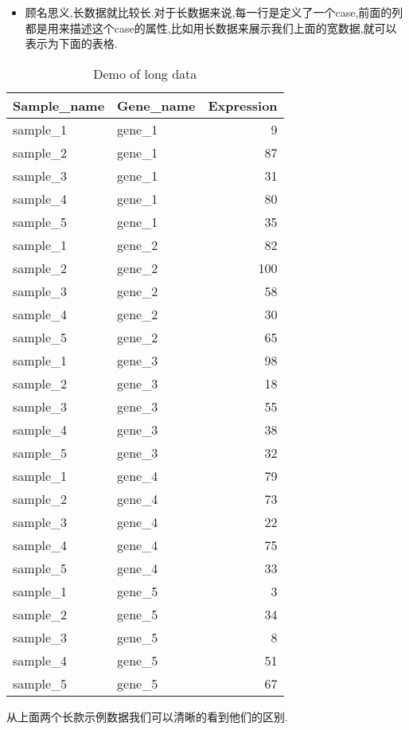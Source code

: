 \documentclass[]{book}
\providecommand{\tightlist}{%
  \setlength{\itemsep}{0pt}\setlength{\parskip}{0pt}}
\begin{document}
\begin{itemize}
\tightlist
\item
  顾名思义,长数据就比较长.对于长数据来说,每一行是定义了一个case,前面的列都是用来描述这个case的属性,比如用长数据来展示我们上面的宽数据,就可以表示为下面的表格.
\end{itemize}

\begin{table}

\caption{\label{tab:unnamed-chunk-2}Demo of long data}
\centering
\begin{tabular}[t]{llr}
\toprule
Sample\_name & Gene\_name & Expression\\
\midrule
sample\_1 & gene\_1 & 9\\
sample\_2 & gene\_1 & 87\\
sample\_3 & gene\_1 & 31\\
sample\_4 & gene\_1 & 80\\
sample\_5 & gene\_1 & 35\\
\addlinespace
sample\_1 & gene\_2 & 82\\
sample\_2 & gene\_2 & 100\\
sample\_3 & gene\_2 & 58\\
sample\_4 & gene\_2 & 30\\
sample\_5 & gene\_2 & 65\\
\addlinespace
sample\_1 & gene\_3 & 98\\
sample\_2 & gene\_3 & 18\\
sample\_3 & gene\_3 & 55\\
sample\_4 & gene\_3 & 38\\
sample\_5 & gene\_3 & 32\\
\addlinespace
sample\_1 & gene\_4 & 79\\
sample\_2 & gene\_4 & 73\\
sample\_3 & gene\_4 & 22\\
sample\_4 & gene\_4 & 75\\
sample\_5 & gene\_4 & 33\\
\addlinespace
sample\_1 & gene\_5 & 3\\
sample\_2 & gene\_5 & 34\\
sample\_3 & gene\_5 & 8\\
sample\_4 & gene\_5 & 51\\
sample\_5 & gene\_5 & 67\\
\bottomrule
\end{tabular}
\end{table}

从上面两个长款示例数据我们可以清晰的看到他们的区别.
\end{document}
